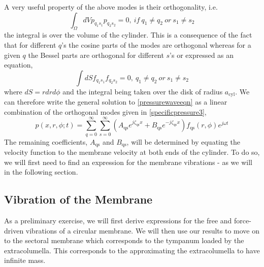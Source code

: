 A very useful property of the above modes is their orthogonality, i.e.
\begin{equation}\label{pressureorthogonality}
 \int_\Omega dVp_{q_1s_1}p_{q_2s_2}=0,\ if\ q_1\neq q_2\ or\ s_1\neq s_2
\end{equation}
the integral is over the volume	 of the cylinder. This is a consequence of the fact that for different $q$'s
the cosine parts of the modes are orthogonal whereas for a given $q$ the Bessel parts are orthogonal for
different $s$'s or expressed as an equation,
\begin{equation}\label{besselorthogonality}
 \int dS f_{q_1s_1}f_{q_2s_2}=0,\ q_1\neq q_2\ or\ s_1\neq s_2
\end{equation}
where $dS=rdrd\phi$ and the integral being taken over the disk of radius $a_{\mathrm{cyl}}$.
We can therefore write the general solution to \eqref{pressurewaveeqn} as a linear combination of the orthogonal modes given in \eqref{specificpressure3},
\begin{equation}\label{pressuregeneral1}
 p(x,r,\phi;t)=\displaystyle\sum^\infty_{q=0}\displaystyle\sum^\infty_{s=0}\left(A_{\mathrm{qs}}e^{j\zeta_{\mathrm{qs}}x}+B_{\mathrm{qs}}e^{-j\zeta_{\mathrm{qs}}x}\right)f_{\mathrm{qs}}(r,\phi)e^{j\omega t}
\end{equation}
The remaining coefficients, $A_{\mathrm{qs}}$ and $B_{\mathrm{qs}}$, will be determined by equating the velocity function to
the membrane velocity at both ends of the cylinder. To do so, we will first need to find an expression
for the membrane vibrations - as we will in the following section.

\subsection{Vibration of the Membrane}\label{membranevibrations}
As a preliminary exercise, we will first derive expressions for the free and force-driven
vibrations of a circular membrane. We will then use our results to move on to the sectoral membrane 
which corresponds to the tympanum loaded by the extracolumella. This corresponds to the approximating
the extracolumella to have infinite mass. 
